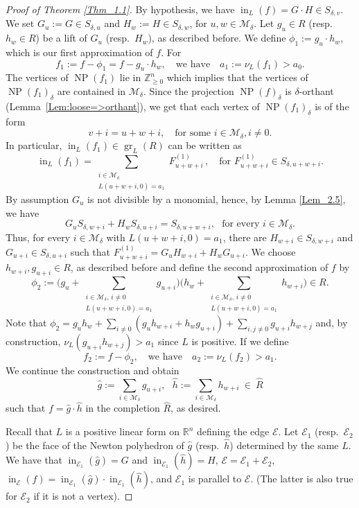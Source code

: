 \documentclass[11pt]{amsart}
\theoremstyle{plain}
\theoremstyle{definition}
\numberwithin{equation}{section}
\newcommand{\gr}{\operatorname{gr}}
\newcommand{\ini}{\operatorname{in}}
\newcommand{\NP}{\operatorname{NP}}
\renewcommand{\d}{\delta}
\newcommand{\RR}{\mathbb R}
\newcommand{\ZZ}{{\mathbb Z}}
\newcommand{\cE}{\mathcal{E}}
\newcommand{\cM}{\mathcal{M}}
\newcommand{\gqz}{{\geq 0}}
\renewcommand{\(}{(\!(}
\renewcommand{\)}{)\!)}
\begin{document}
\begin{proof}[Proof of Theorem \ref{Thm_1.1}]
	By hypothesis, we have $ \ini_L(f) = G \cdot H \in S_{\d, v}. $
	We set $ G_u := G \in S_{\d, u} $ and $ H_w := H \in S_{\d,w} $, for $ u,w \in \cM_\d $.
	Let $ g_u \in R $ (resp.~$ h_w \in R $) be a lift of $ G_u $ (resp.~$H_w $), as described before.
	We define $ \phi_1 :=  g_u \cdot h_w $, which is our first approximation of $ f $.
	For
	\[
		f_1 := f - \phi_1 = f - g_u \cdot h_w,
		\ \ \ \mbox{ we have } \ \ \
		a_1 := \nu_L(f_1) > a_0.
	\]
	The vertices of $ \NP(f_1) $ lie in $ \ZZ^n_\gqz $
	which implies that the vertices of $ \NP(f_1)_\d $ are contained in $ \cM_\d $.
	Since the projection $ \NP(f)_\d $ is $ \d $-orthant (Lemma~\ref{Lem:loose=>orthant}),
	we get that each vertex of $ \NP(f_1)_\d $ is of the form 
	\[
		v + i = u + w + i, 
		\ \ \ \mbox{ for some } i \in \cM_\d, i \neq 0 .
	\]
	In particular, $ \ini_L(f_1) \in \gr_L(R) $ can be written as
	\[
		\ini_L(f_1)  = \sum_{\substack{i \in \cM_\d\\[2pt] L(u+w+i,0) = a_1 }} F_{u+w+i}^{(1)}\, ,
		\ \ \
		\mbox{ for } F_{u+w+i}^{(1)} \in S_{\d, u+w+i}.
	\]
	By assumption $ G_u $ is not divisible by a monomial, hence, by Lemma \ref{Lem_2.5}, we have
	\[
	G_u S_{\d,w+i} + H_w S_{\d,u+i} = S_{\d,u+w+i},
	\ \ \
	\mbox{for every } i \in \cM_\d. 
	\]
	Thus, for every $ i \in \cM_\d $ with $ L(u+w+i,0) = a_1 $, 
	there are $ H_{w+i} \in S_{\d, w+i} $ and 
	$  G_{u+i} \in S_{\d, u+i} $ such that
	$
		F_{u+w+i}^{(1)} = 
		G_u H_{w+i} + H_w G_{u+i}.
	$
	We choose $ h_{w+i}, g_{u+i} \in R $, as described before and define the second approximation of $ f $ by
	\[
		\phi_2 := \Big(g_u + \sum_{\substack{i \in \cM_\d, \, i \neq 0\\[2pt] L(u+w+i,0) = a_1 }} g_{u+i} \Big)
		\Big(h_w + \sum_{\substack{i \in \cM_\d,\, i \neq 0\\[2pt] L(u+w+i,0) = a_1 }} h_{w+i}\Big)
		\in R.
	\]
	Note that $ \phi_2 = g_u h_w + \sum_{i \neq 0} (g_u h_{w+i} + h_w g_{u+i}) + \sum_{i,j \neq 0 } g_{u+i} h_{w+j} $ 
	and, by construction, $ \nu_L(g_{u+i} h_{w+j}) > a_1 $ since $ L $ is positive.
	If we define
	\[
		f_2 := f - \phi_2,
		\ \ \ \mbox{ we have } \ \ \ 
		a_2 := \nu_L(f_2) > a_1.
	\]
	We continue the construction and obtain
	\[
		\widehat g := \sum_{i\in \cM_\d } g_{u+i},
		\ \ \
		\widehat h := \sum_{i\in \cM_\d } h_{w+i} 
		\ \in \
		\widehat R 
	\]
	such that $ f = \widehat g \cdot \widehat h $ in the completion $ \widehat R $,
	as desired.
	
	Recall that $ L $ is a positive linear form on $ \RR^n $ defining the edge $ \cE $.
	Let $ \cE_1 $ (resp.~$ \cE_2 $) be the face of the Newton polyhedron of $ \widehat g $ (resp.~$ \widehat h $) determined by the same $ L $.
	We have that $ \ini_{\cE_1} (\widehat g)  = G $ and $ \ini_{\cE_1} (\widehat h) = H $,
	$ \cE = \cE_1 + \cE_2 $, 
	$
		\ini_\cE (f) = \ini_{\cE_1} (\widehat g)  \cdot \ini_{\cE_1} (\widehat h)
	$,
	and $ \cE_1 $ is parallel to $ \cE $.
	(The latter is also true for $ \cE_2 $ if it is not a vertex).
\end{proof} 
\end{document}
